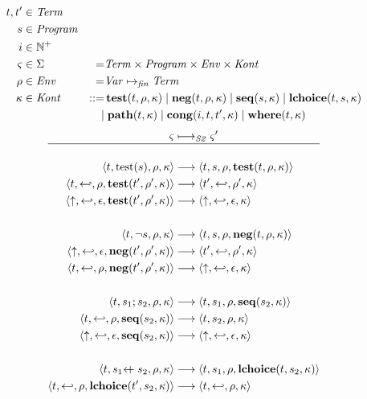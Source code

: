 \documentclass{article}
\begin{document}
{\begin{alignat*}{2}
  t, t' &\in \mathit{Term} && \\
  s &\in \mathit{Program} && \\
  i &\in \mathbb{N}^+ && \\
  \varsigma &\in \Sigma &=& \mathit{Term} \times \mathit{Program} \times \mathit{Env} \times \mathit{Kont} \\
  \rho &\in \mathit{Env} &=& \mathit{Var} \mapsto_{\mathit{fin}} \mathit{Term} \\
  \kappa &\in \mathit{Kont} &::=&\, \mathbf{test}(t,\rho,\kappa) \; | \; \mathbf{neg}(t,\rho,\kappa) \; | \; \mathbf{seq}(s,\kappa) \; | \; \mathbf{lchoice}(t,s,\kappa) \\
  &&|&\; \mathbf{path}(t,\kappa) \; | \; \mathbf{cong}(i,t,t',\kappa) \; | \; \mathbf{where}(t,\kappa)
\end{alignat*}
%
\begin{align*}
  \varsigma & \longmapsto_{\mathit{S2}} \varsigma' \\
  \hline & \\
  \transition{t,\test{s},\rho,\kappa}{t,s,\rho, \cont{test}{t,\rho,\kappa}} \\
  \transition{t,\return,\rho,\cont{test}{t',\rho',\kappa}}{t',\return,\rho',\kappa} \\
  \transition{\fail,\return,\epsilon,\cont{test}{t',\rho',\kappa}}{\fail,\return,\epsilon,\kappa} \\
  \notag \\
  \transition{t,\neg s,\rho,\kappa}{t,s,\rho,\cont{neg}{t,\rho,\kappa}} \\
  \transition{\fail,\return,\epsilon,\cont{neg}{t',\rho',\kappa}}{t',\return,\rho',\kappa} \\
  \transition{t,\return,\rho,\cont{neg}{t',\rho',\kappa}}{\fail,\return,\epsilon,\kappa} \\
  \notag \\
  \transition{t,\seq{s_1}{s_2},\rho,\kappa}{t,s_1,\rho,\cont{seq}{s_2,\kappa}} \\
  \transition{t,\return,\rho,\cont{seq}{s_2,\kappa}}{t,s_2,\rho,\kappa} \\
  \transition{\fail,\return,\epsilon,\cont{seq}{s_2,\kappa}}{\fail,\return,\epsilon,\kappa} \\
  \notag \\
  \transition{t,\leftchoice{s_1}{s_2},\rho,\kappa}{t,s_1,\rho,\cont{lchoice}{t,s_2,\kappa}} \\
  \transition{t,\return,\rho,\cont{lchoice}{t',s_2,\kappa}}{t,\return,\rho,\kappa} \\

\end{align*}}
\end{document}
